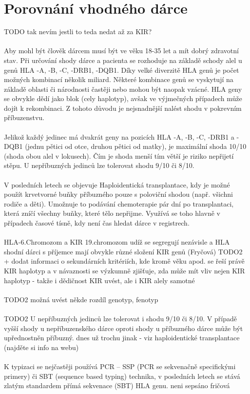 \documentclass[czech,DP]{thesiskiv}
\begin{document}
\section{Porovnání vhodného dárce}
TODO tak nevím jestli to teda nedat až za KIR? 
\\
\\
Aby mohl být člověk dárcem musí být ve věku 18-35 let a mít dobrý zdravotní stav. Při určování shody dárce a pacienta se  rozhoduje na základě schody alel u genů HLA -A, -B, -C, -DRB1, -DQB1. Díky velké diverzitě HLA genů je počet možných kombinací několik miliard. Některé kombinace genů se vyskytují na základě oblasti či národnosti častěji nebo mohou být naopak vzácné. HLA geny se obvykle dědí jako blok (cely haplotyp), avšak ve výjmečných případech může dojít k rekombinaci. Z tohoto důvodu je nejsnadnější nalést shodu v pokrevním příbuzenstvu.
\\
\\
Jelikož každý jedinec má dvakrát geny na pozicích HLA -A, -B, -C, -DRB1 a -DQB1 (jednu pětici od otce, druhou pětici od matky), je maximální shoda 10/10 (shoda obou alel v lokusech). Čím je shoda menší tím větší je riziko nepřijetí stěpu. U nepříbuzných jedinců lze tolerovat shodu 9/10 či 8/10. \cite{Frycova_bakalarka} \cite{KIR_transplantace_jindra}
\\
\\
V posledních letech se objevuje Haploidentická transplantace, kdy je možné použít krvetvorné buňky příbuzného pouze s poloviční shodou (např. všichni rodiče a děti). Umožnuje to podávání chemoterapie pár dní po transplantaci, která zníčí všechny buňky, které tělo nepřijme. Využívá se toho hlavně v případech časové tísně, kdy není čas hledat dárce v registrech. \cite{haploidenticka_transplantace}
\\
\\

HLA-6.Chromozom a KIR 19.chromozom
udíž se segregují nezávisle a
HLA shodní dárci s příjemce mají obvykle různé složení KIR genů (Fryčová)
TODO2
+ dodat informaci o sekundárních kritériích, kde kromě věku apod. se řeší právě KIR haplotyp a v návaznosti se výzkumně zjišťuje, zda může mít vliv nejen KIR haplotyp - takže i dědičnost KIR uvést, ale i KIR alely samotné
\\
\\
TODO2 možná uvést někde rozdíl genotyp, fenotyp
\\
\\

TODO2 U nepříbuzných jedinců lze tolerovat i shodu 9/10 či 8/10. V případě vyšší shody u nepříbuzenského dárce oproti shody u příbuzného dárce může být upřednostněn příbuzný. dnes už trochu jinak - viz haploidentické transplantace (najděte si info na webu)
\\
\\
K typizaci se nejčastěji používá PCR – SSP (PCR se sekvenačně specifickými primery) či
SBT (sequence based typing) technika, v posledních letech se stává zlatým standardem přímá
sekvenace (SBT) HLA genu.
neni sepsáno fričová
\end{document}
